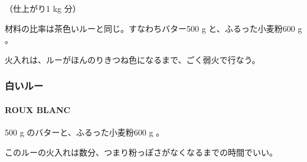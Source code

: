 \documentclass[twoside,12Q,b5j]{escoffierltjsbook}
\newenvironment{recette}{\begin{multicols}{2}}{\end{multicols}}
\begin{document}
\begin{recette}

（仕上がり1 kg 分）

材料の比率は茶色いルーと同じ。すなわちバター500 g と、ふるった小麦粉600
g 。

火入れは、ルーがほんのりきつね色になるまで、ごく弱火で行なう。

\vspace*{2\zw}

\subsubsection{白いルー}\label{ux767dux3044ux30ebux30fc}

\paragraph{ROUX BLANC}\label{roux-blanc}


500 g のバターと、ふるった小麦粉600 g 。

このルーの火入れは数分、つまり粉っぽさがなくなるまでの時間でいい。

\end{recette}

{\printindex}
\end{document}

